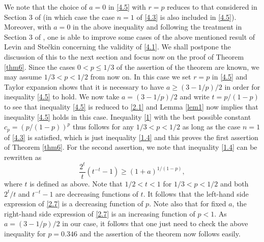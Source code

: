 \documentclass[11pt]{amsart}
\numberwithin{equation}{section}
\theoremstyle{definition}
\theoremstyle{remark}
\begin{document}
    We note that the choice of $a=0$ in \eqref{4.5} with $r=p$ reduces to that considered in Section 3 of
  \cite{G6} (in which case the case $n=1$ of \eqref{4.3} is also included in \eqref{4.5}).
  Moreover, with $a=0$ in the above inequality and following the treatment in Section 3 of \cite{G6}, one is
    able to improve some cases of
    the above mentioned result of Levin and Ste\v ckin concerning the validity of \eqref{4.1}.
    We shall postpone the discussion of this to the next section and focus now on the proof of Theorem \ref{thm6}.
  Since the cases $0< p \leq 1/3$ of the assertion of the theorem
  are known, we may assume $1/3<p<1/2$ from now on. In this case we set $r=p$ in \eqref{4.5} and
  Taylor expansion shows that it is necessary to have $a \geq (3-1/p)/2$ in order
  for
  inequality \eqref{4.5} to hold.  We now take $a=(3-1/p)/2$ and write $t=p/(1-p)$ to
  see that inequality \eqref{4.5} is reduced to \eqref{2.1} and
  Lemma \ref{lem1} now implies that inequality \eqref{4.5} holds
  in this case. Inequality \eqref{1} with the best possible constant $c_{p}=(p/(1-p))^p$
  thus follows for any $1/3<p<1/2$ as long as the case $n=1$ of \eqref{4.3} is satisfied, which is just inequality \eqref{1.4} and
  this proves the first assertion of Theorem \ref{thm6}. For the second assertion, we note that inequality \eqref{1.4}
  can be rewritten as
\begin{equation}
\label{2.7}
   \frac {2^t}{t}(t^{-t}-1) \geq (1+a)^{1/(1-p)},
\end{equation}
   where $t$ is defined as above. Note that $1/2<t<1$ for $1/3 < p <1/2$ and
   both $2^t/t$ and $t^{-t}-1$ are decreasing functions of $t$. It
   follows that the left-hand side expression of \eqref{2.7} is a
   decreasing function of $p$.
   Note also that for fixed $a$, the right-hand side expression of \eqref{2.7} is an increasing
   function of $p<1$. As $a=(3-1/p)/2$ in our case, it follows that one just need to check the above inequality for $p=0.346$ and the
   assertion of the theorem now follows easily.
\end{document}
